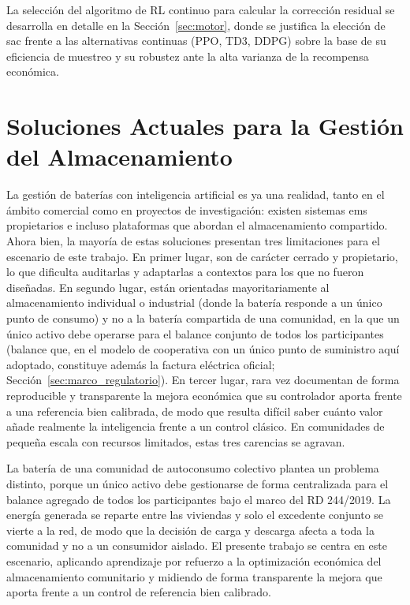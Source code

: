 \documentclass[12pt, a4paper, twoside]{report}
\begin{document}
La selección del algoritmo de RL continuo para calcular la corrección residual
se desarrolla en detalle en la Sección~\ref{sec:motor}, donde se justifica la
elección de \acrshort{sac} frente a las alternativas continuas (PPO, TD3, DDPG)
sobre la base de su eficiencia de muestreo y su robustez ante la alta varianza
de la recompensa económica.

\section{Soluciones Actuales para la Gestión del Almacenamiento}

La gestión de baterías con inteligencia artificial es ya una realidad, tanto en
el ámbito comercial como en proyectos de investigación: existen sistemas \acrshort{ems}
propietarios e incluso plataformas que abordan el almacenamiento compartido.
Ahora bien, la mayoría de estas soluciones presentan tres limitaciones para el
escenario de este trabajo. En primer lugar, son de carácter cerrado y
propietario, lo que dificulta auditarlas y adaptarlas a contextos para los que
no fueron diseñadas. En segundo lugar, están orientadas mayoritariamente al
almacenamiento individual o industrial (donde la batería responde a un único
punto de consumo) y no a la batería compartida de una comunidad, en la que un
único activo debe operarse para el balance conjunto de todos los participantes
(balance que, en el modelo de cooperativa con un único punto de suministro
aquí adoptado, constituye además la factura eléctrica oficial;
Sección~\ref{sec:marco_regulatorio}). En tercer
lugar, rara vez documentan de forma reproducible y transparente la mejora
económica que su controlador aporta frente a una referencia bien calibrada, de
modo que resulta difícil saber cuánto valor añade realmente la inteligencia
frente a un control clásico. En comunidades de pequeña escala con recursos
limitados, estas tres carencias se agravan.

La batería de una comunidad de autoconsumo colectivo plantea un problema
distinto, porque un único activo debe gestionarse de forma centralizada para el
balance agregado de todos los participantes bajo el marco del RD 244/2019. La
energía generada se reparte entre las viviendas y solo el excedente conjunto se
vierte a la red, de modo que la decisión de carga y descarga afecta a toda la
comunidad y no a un consumidor aislado. El presente trabajo se centra en este
escenario, aplicando aprendizaje por refuerzo a la optimización económica del
almacenamiento comunitario y midiendo de forma transparente la mejora que aporta
frente a un control de referencia bien calibrado.
\end{document}
